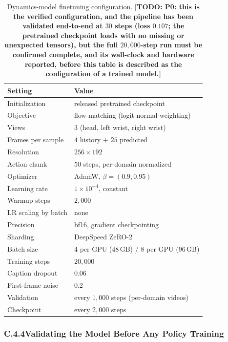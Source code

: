 \documentclass[letterpaper]{article} %
\newcommand{\todo}[1]{\textbf{[TODO: #1]}}
\begin{document}
\begin{table}[t]
\centering\small\setlength{\tabcolsep}{4pt}
\begin{tabular}{@{}ll@{}}
\toprule
Setting & Value \\
\midrule
Initialization      & released pretrained checkpoint \\
Objective           & flow matching (logit-normal weighting) \\
Views               & $3$ (head, left wrist, right wrist) \\
Frames per sample   & $4$ history $+$ $25$ predicted \\
Resolution          & $256{\times}192$ \\
Action chunk        & $50$ steps, per-domain normalized \\
Optimizer           & AdamW, $\beta=(0.9, 0.95)$ \\
Learning rate       & $1{\times}10^{-4}$, constant \\
Warmup steps        & $2{,}000$ \\
LR scaling by batch & none \\
Precision           & bf16, gradient checkpointing \\
Sharding            & DeepSpeed ZeRO-2 \\
Batch size          & $4$ per GPU ($48$\,GB) / $8$ per GPU ($96$\,GB) \\
Training steps      & $20{,}000$ \\
Caption dropout     & $0.06$ \\
First-frame noise   & $0.2$ \\
Validation          & every $1{,}000$ steps (per-domain videos) \\
Checkpoint          & every $2{,}000$ steps \\
\bottomrule
\end{tabular}
\caption{Dynamics-model finetuning configuration. \todo{P0: this is the verified
configuration, and the pipeline has been validated end-to-end at $30$ steps
(loss $0.107$; the pretrained checkpoint loads with no missing or unexpected
tensors), but the full $20{,}000$-step run must be confirmed complete, and its
wall-clock and hardware reported, before this table is described as the
configuration of a trained model.}}
\label{tab:wmhp}
\end{table}

\subsubsection{C.4.4\quad Validating the Model Before Any Policy Training}
\end{document}
